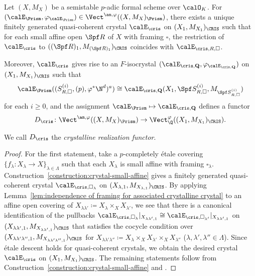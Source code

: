 \begin{cor}  \label{cor:crystalline-realization}
Let $(X,M_X)$ be a semistable $p$-adic formal scheme over $\calO_K$.
For $(\calE_\Prism,\varphi_{\calE_\Prism})\in \Vect^{\an,\varphi}((X,M_X)_\Prism)$, there exists a unique finitely generated quasi-coherent crystal $\calE_\cris$ on $(X_1,M_{X_1})_\CRIS$ such that for each small affine open $\Spf R$ of $X$ with framing $\square$, the restriction of $\calE_{\cris}$ to $((\Spf R)_1,M_{(\Spf R)_1})_\CRIS$ coincides with $\calE_{\cris,R,\square}$. 

Moreover, $\calE_{\cris}$ gives rise to an $F$-isocrystal $(\calE_{\cris, \mathbf{Q}},\varphi_{\calE_{\cris, \mathbf{Q}}})$ on $(X_1,M_{X_1})_\CRIS$ such that 
\begin{equation}\label{eq:crystalline realization}
\calE_\Prism((S_{R,\square}^{(i)},(p),\varphi^{\ast}\N^d)^a) \cong \calE_{\cris, \mathbf{Q}}(X_1,\Spf S_{R,\square}^{(i)},M_{\Spf S_{R,\square}^{(i)}})
\end{equation}
for each $i \geq 0$, and the assignment $\calE_\Prism \mapsto \calE_{\cris, \mathbf{Q}}$ defines a functor 
\[
D_{\cris}\colon \Vect^{\an,\varphi}((X,M_X)_\Prism) \to \Vect_\Q^\varphi((X_1,M_{X_1})_\CRIS).
\]
\end{cor}

We call $D_\cris$ the \emph{crystalline realization functor}.

\begin{proof}
For the first statement, take a $p$-completely \'etale covering $\{f_\lambda\colon X_\lambda\rightarrow X\}_{\lambda\in \Lambda}$ such that each $X_\lambda$ is small affine with framing $\square_\lambda$. Construction~\ref{construction:crystal-small-affine} gives a finitely generated quasi-coherent crystal $\calE_{\cris,\square_\lambda}$ on $(X_{\lambda,1},M_{X_{\lambda,1}})_\CRIS$. By applying  Lemma~\ref{lem:independence of framing for associated crystalline crystal} to an affine open covering of $X_{\lambda\lambda'}\coloneqq X_\lambda\times_XX_{\lambda'}$, we see that there is a canonical identification of the pullbacks $\calE_{\cris,\square_\lambda}|_{X_{\lambda\lambda',1}}\cong \calE_{\cris,\square_{\lambda'}}|_{X_{\lambda\lambda',1}}$ on $(X_{\lambda\lambda',1},M_{X_{\lambda\lambda',1}})_\CRIS$ that satisfies the cocycle condition over $(X_{\lambda\lambda'\lambda'',1},M_{X_{\lambda\lambda'\lambda'',1}})_\CRIS$ for $X_{\lambda\lambda'\lambda''}\coloneqq X_\lambda\times_XX_{\lambda'}\times_XX_{\lambda''}$ ($\lambda,\lambda',\lambda''\in \Lambda$). Since \'etale descent holds for quasi-coherent crystals, we obtain the desired crystal $\calE_\cris$ on $(X_1,M_{X_1})_\CRIS$. The remaining statements follow from Construction~\ref{construction:crystal-small-affine} and \cite[Lem.~3.24(iv)]{du-liu-moon-shimizu-completed-prismatic-F-crystal-loc-system}. 
\end{proof}




